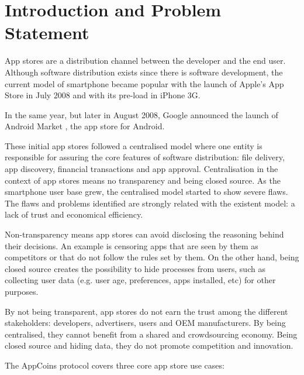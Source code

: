 
\section{Introduction and Problem Statement}
\label{sec: introduction}




App stores are a distribution channel between the developer and the end user. Although software distribution exists since there is software development, the current model of smartphone became popular with the launch of Apple's App Store in July 2008 and with its pre-load in iPhone 3G.

In the same year, but later in August 2008, Google announced the launch of Android Market \cite{wiki:market}, the app store for Android.

These initial app stores followed a centralised model where one entity is responsible for assuring the core features of software distribution: file delivery, app discovery, financial transactions and app approval. Centralisation in the context of app stores means no transparency and being closed source. As the smartphone user base grew, the centralised model started to show severe flaws. The flaws and problems identified are strongly related with the existent model: a lack of trust and economical efficiency.

Non-transparency means app stores can avoid disclosing the reasoning behind their decisions. An example is censoring apps that are seen by them as competitors or that do not follow the rules set by them. On the other hand, being closed source creates the possibility to hide processes from users, such as collecting user data (e.g. user age, preferences, apps installed, etc) for other purposes.

By not being transparent, app stores do not earn the trust among the different stakeholders: developers, advertisers, users and OEM manufacturers. By being centralised, they cannot benefit from a shared and crowdsourcing economy. Being closed source and hiding data, they do not promote competition and innovation.

The AppCoins protocol covers three core app store use cases:


